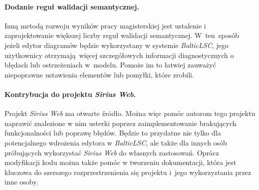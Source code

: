 \paragraph{Dodanie reguł walidacji semantycznej.}
Inną metodą rozwoju wyników pracy magisterskiej jest ustalenie i
zaprojektowanie większej liczby reguł walidacji semantycznej. W~ten~sposób
jeżeli edytor diagramów będzie wykorzystany w systemie \emph{BalticLSC}, jego
użytkownicy otrzymają więcej szczegółowych informacji diagnostycznych o błędach
lub ostrzeżeniach w~modelu. Pomoże im to łatwiej zauważyć niepoprawne
ustawienia elementów lub pomyłki, które zrobili.

\paragraph{Kontrybucja do projektu \emph{Sirius Web}.}
Projekt \emph{Sirius Web} ma otwarte źródło. Można więc pomóc autorom tego
projektu naprawić znalezione w nim usterki poprzez zaimplementowanie
brakujących funkcjonalności lub poprawę błędów. Będzie to przydatne nie tylko
dla potencjalnego wdrożenia edytora w \emph{BalticLSC}, ale także dla innych
osób próbujących wykorzystać \emph{Sirius Web} do własnych zastosowań.
Oprócz modyfikacji kodu można także pomóc w tworzeniu dokumentacji, która jest
kluczowa do szerszego rozprzestrzenienia się projektu i~jego wykorzystania
przez inne osoby.

